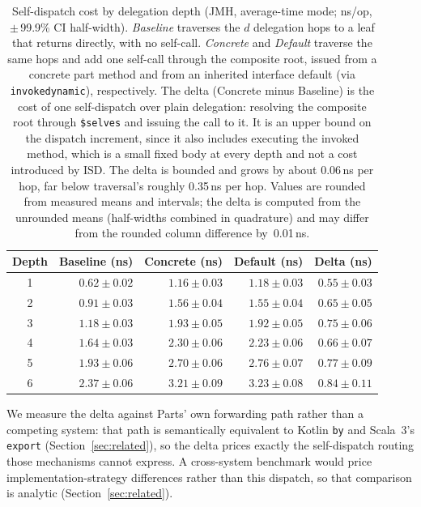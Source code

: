 \documentclass[acmsmall,screen,review,anonymous]{acmart}
\theoremstyle{acmplain}
\newcommand{\code}[1]{\texttt{#1}}
\begin{document}
\begin{table}[htbp]
\centering
\caption{Self-dispatch cost by delegation depth (JMH, average-time mode; ns/op,
$\pm$\,99.9\% CI half-width). \emph{Baseline} traverses the $d$ delegation hops
to a leaf that returns directly, with no self-call. \emph{Concrete} and
\emph{Default} traverse the same hops and add one self-call through the composite
root, issued from a concrete part method and from an inherited interface default
(via \code{invokedynamic}), respectively. The delta (Concrete minus Baseline) is
the cost of one self-dispatch over plain
delegation: resolving the composite root through \code{\$selves} and issuing the
call to it. It is an upper bound on the dispatch increment, since it also
includes executing the invoked method, which is a small fixed body at every
depth and not a cost introduced by ISD. The delta is bounded and grows by about
0.06\,ns per hop, far below traversal's roughly 0.35\,ns per hop.
Values are rounded from measured means and intervals; the
delta is computed from the unrounded means (half-widths combined in quadrature)
and may differ from the rounded column difference by~0.01\,ns.}
\label{tab:bench}
{\small
\begin{tabular}{crrrr}
\toprule
Depth & Baseline (ns) & Concrete (ns) & Default (ns) & Delta (ns) \\
\midrule
1 & $0.62 \pm 0.02$ & $1.16 \pm 0.03$ & $1.18 \pm 0.03$ & $0.55 \pm 0.03$ \\
2 & $0.91 \pm 0.03$ & $1.56 \pm 0.04$ & $1.55 \pm 0.04$ & $0.65 \pm 0.05$ \\
3 & $1.18 \pm 0.03$ & $1.93 \pm 0.05$ & $1.92 \pm 0.05$ & $0.75 \pm 0.06$ \\
4 & $1.64 \pm 0.03$ & $2.30 \pm 0.06$ & $2.23 \pm 0.06$ & $0.66 \pm 0.07$ \\
5 & $1.93 \pm 0.06$ & $2.70 \pm 0.06$ & $2.76 \pm 0.07$ & $0.77 \pm 0.09$ \\
6 & $2.37 \pm 0.06$ & $3.21 \pm 0.09$ & $3.23 \pm 0.08$ & $0.84 \pm 0.11$ \\
\bottomrule
\end{tabular}
}
\end{table}

We measure the delta against Parts' own forwarding path rather than a competing
system: that path is semantically equivalent to Kotlin \code{by} and Scala~3's
\code{export} (Section~\ref{sec:related}), so the delta prices exactly the
self-dispatch routing those mechanisms cannot express. A cross-system benchmark would
price implementation-strategy differences rather than this dispatch, so that
comparison is analytic (Section~\ref{sec:related}).
\end{document}
